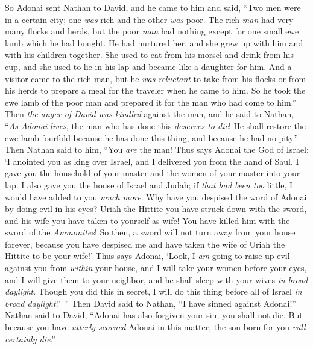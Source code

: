 \begin{biblechapter} %
 So Adonai sent Nathan to David, and he came to him and said, “Two men were in a certain city; one \textit{was} rich and the other \textit{was} poor.
\verse The rich \textit{man} had very many flocks and herds,
\verse but the poor \textit{man} had nothing except for one small ewe lamb which he had bought. He had nurtured her, and she grew up with him and with his children together. She used to eat from his morsel and drink from his cup, and she used to lie in his lap and became like a daughter for him.
\verse And a visitor came to the rich man, but he \textit{was reluctant} to take from his flocks or from his herds to prepare a meal for the traveler when he came to him. So he took the ewe lamb of the poor man and prepared it for the man who had come to him.”
\verse Then \textit{the anger of David was kindled} against the man, and he said to Nathan, “\textit{As Adonai lives}, the man who has done this \textit{deserves to die}!
\verse He shall restore the ewe lamb fourfold because he has done this thing, and because he had no pity.”
\verse Then Nathan said to him, “You \textit{are} the man! Thus says Adonai the God of Israel: ‘I anointed you as king over Israel, and I delivered you from the hand of Saul.
\verse I gave you the household of your master and the women of your master into your lap. I also gave you the house of Israel and Judah; if \textit{that had been too} little, I would have added to you \textit{much more}.
\verse Why have you despised the word of Adonai by doing evil in his eyes? Uriah the Hittite you have struck down with the sword, and his wife you have taken to yourself as wife! You have killed him with the sword of the \textit{Ammonites}!
\verse So then, a sword will not turn away from your house forever, because you have despised me and have taken the wife of Uriah the Hittite to be your wife!’
\verse Thus says Adonai, ‘Look, I \textit{am} going to raise up evil against you from \textit{within} your house, and I will take your women before your eyes, and I will give them to your neighbor, and he shall sleep with your wives \textit{in broad daylight}.
\verse Though you did this in secret, I will do this thing before all of Israel \textit{in broad daylight}!’ ”
 Then David said to Nathan, “I have sinned against Adonai!” Nathan said to David, “Adonai has also forgiven your sin; you shall not die.
\verse But because you have \textit{utterly scorned} Adonai in this matter, the son born for you \textit{will certainly die}.”

\end{biblechapter}
